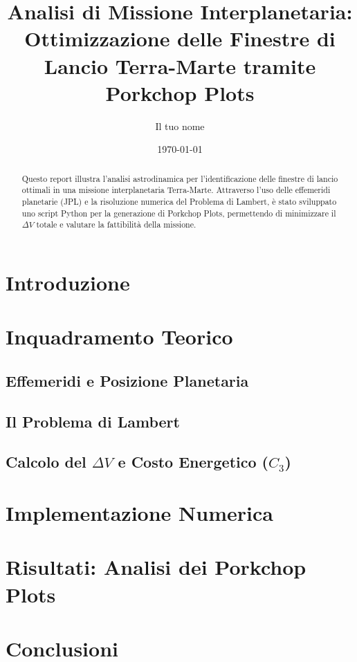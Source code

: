 \documentclass[11pt, a4paper]{article}
\title{\textbf{Analisi di Missione Interplanetaria: \\ Ottimizzazione delle Finestre di Lancio Terra-Marte tramite Porkchop Plots}}
\author{Il tuo nome}
\date{\today}
\begin{document}
\maketitle

\begin{abstract}
Questo report illustra l'analisi astrodinamica per l'identificazione delle finestre di lancio ottimali in una missione interplanetaria Terra-Marte. Attraverso l'uso delle effemeridi planetarie (JPL) e la risoluzione numerica del Problema di Lambert, è stato sviluppato uno script Python per la generazione di Porkchop Plots, permettendo di minimizzare il $\Delta V$ totale e valutare la fattibilità della missione.
\end{abstract}

\section{Introduzione}

\section{Inquadramento Teorico}
\subsection{Effemeridi e Posizione Planetaria}

\subsection{Il Problema di Lambert}

\subsection{Calcolo del $\Delta V$ e Costo Energetico ($C_3$)}

\section{Implementazione Numerica}

\section{Risultati: Analisi dei Porkchop Plots}

\section{Conclusioni}
\end{document}
